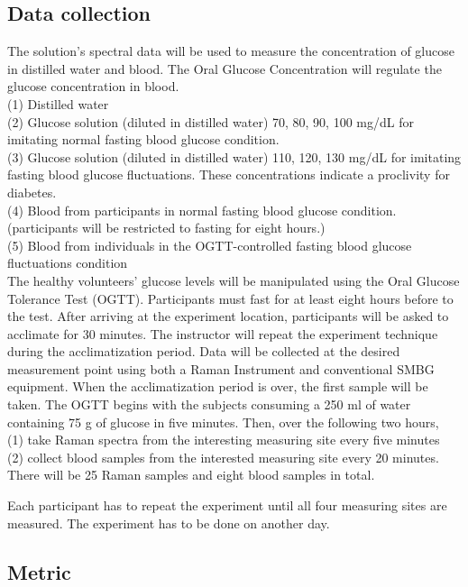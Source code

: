 \subsection{Data collection}
The solution's spectral data will be used to measure the concentration of glucose in distilled water and blood. The Oral Glucose Concentration will regulate the glucose concentration in blood.
\\(1) Distilled water
\\(2) Glucose solution (diluted in distilled water) 70, 80, 90, 100 mg/dL for imitating normal fasting blood glucose condition.
\\(3) Glucose solution (diluted in distilled water) 110, 120, 130 mg/dL for imitating fasting blood glucose fluctuations. These concentrations indicate a proclivity for diabetes.
\\(4) Blood from participants in normal fasting blood glucose condition. (participants will be restricted to fasting for eight hours.)
\\(5)  Blood from individuals in the OGTT-controlled fasting blood glucose fluctuations condition
\\
The healthy volunteers' glucose levels will be manipulated using the Oral Glucose Tolerance Test (OGTT).
Participants must fast for at least eight hours before to the test.
After arriving at the experiment location, participants will be asked to acclimate for 30 minutes.
The instructor will repeat the experiment technique during the acclimatization period.
Data will be collected at the desired measurement point using both a Raman Instrument and conventional SMBG equipment.
When the acclimatization period is over, the first sample will be taken.
The OGTT begins with the subjects consuming a 250 ml of water containing 75 g of glucose in five minutes.
Then, over the following two hours, 
\\(1) take Raman spectra from the interesting measuring site every five minutes
\\(2) collect blood samples from the interested measuring site every 20 minutes.
\\There will be 25 Raman samples and eight blood samples in total.

Each participant has to repeat the experiment until all four measuring sites are measured. 
The experiment has to be done on another day.

\subsection{Metric}

